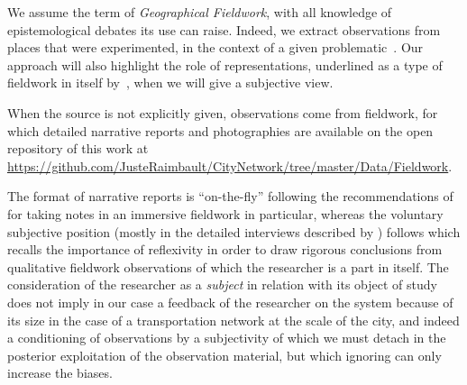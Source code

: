 We assume the term of \emph{Geographical Fieldwork}, with all knowledge of epistemological debates its use can raise. Indeed, we extract observations from places that were experimented, in the context of a given problematic~\citep{retaille2010terrain}. Our approach will also highlight the role of representations, underlined as a type of fieldwork in itself by~\cite{lefort2012terrain}, when we will give a subjective view.

  When the source is not explicitly given, observations come from fieldwork, for which detailed narrative reports and photographies are available on the open repository of this work at \url{https://github.com/JusteRaimbault/CityNetwork/tree/master/Data/Fieldwork}.

The format of narrative reports is ``on-the-fly'' following the recommendations of \cite{goffman1989fieldwork} for taking notes in an immersive fieldwork in particular, whereas the voluntary subjective position (mostly in the detailed interviews described by \cite{raimbault2018caracterisation}) follows \cite{ball1990self} which recalls the importance of reflexivity in order to draw rigorous conclusions from qualitative fieldwork observations of which the researcher is a part in itself. The consideration of the researcher as a \emph{subject} in relation with its object of study does not imply in our case a feedback of the researcher on the system because of its size in the case of a transportation network at the scale of the city, and indeed a conditioning of observations by a subjectivity of which we must detach in the posterior exploitation of the observation material, but which ignoring can only increase the biases.


